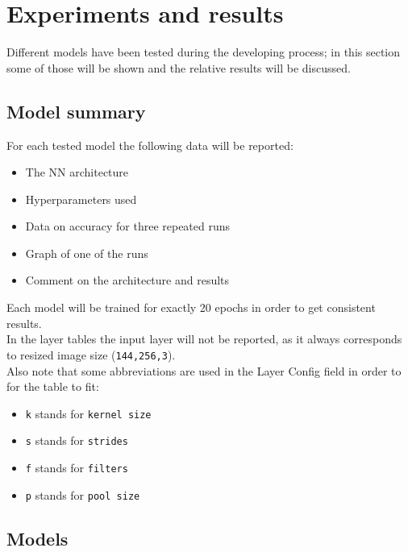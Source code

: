 \documentclass[a4paper,12pt]{article}
\begin{document}
\section{Experiments and results}
Different models have been tested during the developing process; in this section some of those will be shown and the relative results will be discussed.
\subsection{Model summary}
For each tested model the following data will be reported:
\begin{itemize}
\item The NN architecture
\item Hyperparameters used
\item Data on accuracy for three repeated runs
\item Graph of one of the runs
\item Comment on the architecture and results
\end{itemize}
Each model will be trained for exactly 20 epochs in order to get consistent results.\\
In the layer tables the input  layer will not be reported, as it always corresponds to resized image size (\texttt{144,256,3}).\\
Also note that some abbreviations are used in the Layer Config field in order to for the table to fit:
\begin{itemize}
\item \texttt{k} stands for \texttt{kernel size}
\item \texttt{s} stands for \texttt{strides}
\item \texttt{f} stands for \texttt{filters}
\item \texttt{p} stands for \texttt{pool size}
\end{itemize}

\newcommand{\conv}{Convolution(\texttt{Conv2d})}
\newcommand{\convP}[3]{\texttt{k=#1, s=#2, f=#3}}
\newcommand{\convKSF}[3]{\convP{#1}{#2}{#3}}

\newcommand{\flt}{Flatten(\texttt{Flatten})}

\newcommand{\dns}{Dense(\texttt{Dense})}
\newcommand{\dnsP}[1]{\texttt{u=#1}}

\newcommand{\pool}{MaxPooling(\texttt{MaxPooling2D})}
\newcommand{\poolN}{\texttt{p=2x2}}

\subsection{Models}
\end{document}
